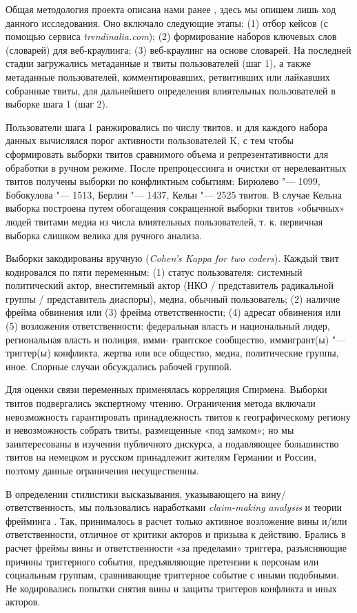 Общая методология проекта описана нами ранее \cite{BodrunovaLitvinenkoBlekanov2016,BodrunovaLitvinenkoBlekanov2017}, здесь мы опишем лишь ход данного исследования. Оно включало следующие этапы: (1) отбор кейсов (с помощью сервиса \textit{trendinalia.com}); (2) формирование наборов ключевых слов (словарей) для веб-краулинга; (3) веб-краулинг на основе словарей. На последней стадии загружались метаданные и твиты пользователей (шаг 1), а также метаданные пользователей, комментировавших, ретвитивших или лайкавших собранные твиты, для дальнейшего определения влиятельных пользователей в выборке шага 1 (шаг 2).

Пользователи шага 1 ранжировались по числу твитов, и для каждого набора данных вычислялся порог активности пользователей K, с тем чтобы сформировать выборки твитов сравнимого объема и репрезентативности для обработки в ручном режиме. После препроцессинга и очистки от нерелевантных твитов получены выборки по конфликтным событиям: Бирюлево "--- 1099, Бобокулова "--- 1513, Берлин "--- 1437, Кельн "--- 2525 твитов. В случае Кельна выборка построена путем обогащения сокращенной выборки твитов «обычных» людей твитами медиа из числа влиятельных пользователей, т. к. первичная выборка слишком велика для ручного анализа.

Выборки закодированы вручную (\textit{Cohen’s Kappa for two coders}). Каждый твит кодировался по пяти переменным: (1) статус пользователя: системный политический актор, внеститемный актор (НКО / представитель радикальной группы / представитель диаспоры), медиа, обычный пользователь; (2) наличие фрейма обвинения или (3) фрейма ответственности; (4) адресат обвинения или (5) возложения ответственности: федеральная власть и национальный лидер, региональная власть и полиция, имми- грантское сообщество, иммигрант(ы) "--- триггер(ы) конфликта, жертва или все общество, медиа, политические группы, иное. Спорные случаи обсуждались рабочей группой.

Для оценки связи переменных применялась корреляция Спирмена. Выборки твитов подвергались экспертному чтению. Ограничения метода включали невозможность гарантировать принадлежность твитов к географическому региону и невозможность собрать твиты, размещенные «под замком»; но мы заинтересованы в изучении публичного дискурса, а подавляющее большинство твитов на немецком и русском принадлежит жителям Германии и России, поэтому данные ограничения несущественны.

В определении стилистики высказывания, указывающего на вину/ ответственность, мы пользовались наработками \textit{claim-making analysis} и теории фрейминга \cite{Fuersich}. Так, принималось в расчет только активное возложение вины и/или ответственности, отличное от критики акторов и призыва к действию. Брались в расчет фреймы вины и ответственности «за пределами» триггера, разъясняющие причины триггерного события, предъявляющие претензии к персонам или социальным группам, сравнивающие триггерное событие с иными подобными. Не кодировались попытки снятия вины и защиты триггеров конфликта и иных акторов.

